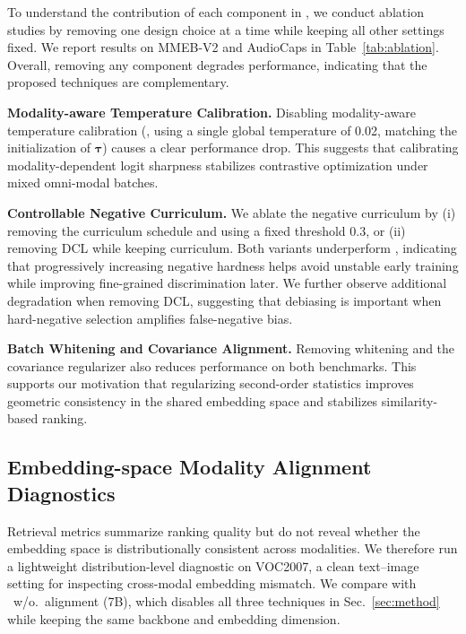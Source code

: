 To understand the contribution of each component in \ours{}, we conduct ablation studies by removing one design choice at a time while keeping all other settings fixed.
We report results on MMEB-V2 and AudioCaps in Table~\ref{tab:ablation}.
Overall, removing any component degrades performance, indicating that the proposed techniques are complementary.

\noindent\textbf{Modality-aware Temperature Calibration.}
Disabling modality-aware temperature calibration (\ie, using a single global temperature of 0.02, matching the initialization of $\boldsymbol{\tau}$) causes a clear performance drop.
This suggests that calibrating modality-dependent logit sharpness stabilizes contrastive optimization under mixed omni-modal batches.

\noindent\textbf{Controllable Negative Curriculum.}
We ablate the negative curriculum by (i) removing the curriculum schedule and using a fixed threshold 0.3, or (ii) removing DCL while keeping curriculum.
Both variants underperform \ours{}, indicating that progressively increasing negative hardness helps avoid unstable early training while improving fine-grained discrimination later.
We further observe additional degradation when removing DCL, suggesting that debiasing is important when hard-negative selection amplifies false-negative bias.

\noindent\textbf{Batch Whitening and Covariance Alignment.}
Removing whitening and the covariance regularizer also reduces performance on both benchmarks.
This supports our motivation that regularizing second-order statistics improves geometric consistency in the shared embedding space and stabilizes similarity-based ranking.




\subsection{Embedding-space Modality Alignment Diagnostics}
\label{subsec:exp-align-viz}

Retrieval metrics summarize ranking quality but do not reveal whether the embedding space is distributionally consistent across modalities.
We therefore run a lightweight distribution-level diagnostic on VOC2007, a clean text--image setting for inspecting cross-modal embedding mismatch.
We compare \ours{} with \ours{}~w/o.\ alignment (7B), which disables all three techniques in Sec.~\ref{sec:method} while keeping the same backbone and embedding dimension.


